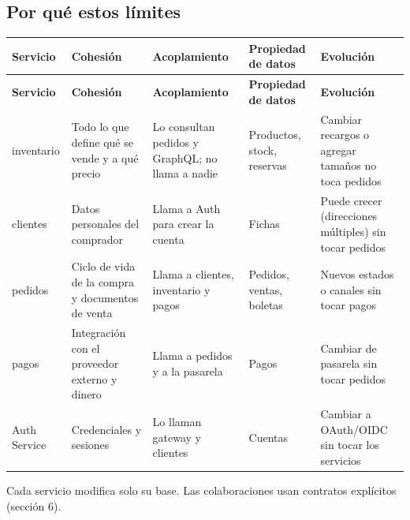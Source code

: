 \subsection{Por qué estos límites}

{\footnotesize
\setlength{\tabcolsep}{3pt}\renewcommand{\arraystretch}{1.15}
\begin{longtable}{|>{\raggedright\arraybackslash}p{}|>{\raggedright\arraybackslash}p{}|>{\raggedright\arraybackslash}p{}|>{\raggedright\arraybackslash}p{}|>{\raggedright\arraybackslash}p{}|}
\hline
\textbf{Servicio} & \textbf{Cohesión} & \textbf{Acoplamiento} & \textbf{Propiedad de datos} & \textbf{Evolución} \\ \hline
\endfirsthead
\hline
\textbf{Servicio} & \textbf{Cohesión} & \textbf{Acoplamiento} & \textbf{Propiedad de datos} & \textbf{Evolución} \\ \hline
\endhead
inventario & Todo lo que define qué se vende y a qué precio & Lo consultan pedidos y GraphQL; no llama a nadie & Productos, stock, reservas & Cambiar recargos o agregar tamaños no toca pedidos \\ \hline
clientes & Datos personales del comprador & Llama a Auth para crear la cuenta & Fichas & Puede crecer (direcciones múltiples) sin tocar pedidos \\ \hline
pedidos & Ciclo de vida de la compra y documentos de venta & Llama a clientes, inventario y pagos & Pedidos, ventas, boletas & Nuevos estados o canales sin tocar pagos \\ \hline
pagos & Integración con el proveedor externo y dinero & Llama a pedidos y a la pasarela & Pagos & Cambiar de pasarela sin tocar pedidos \\ \hline
Auth Service & Credenciales y sesiones & Lo llaman gateway y clientes & Cuentas & Cambiar a OAuth/OIDC sin tocar los servicios \\ \hline
\end{longtable}
}

Cada servicio modifica solo su base. Las colaboraciones usan contratos explícitos (sección 6).

